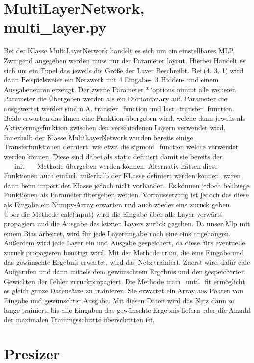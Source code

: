 \documentclass[a4paper]{article}
\title{\trtitle}
\author{\trauthor}
\date{\today}
\begin{document}
	\maketitle
	
	\section{MultiLayerNetwork, multi\_layer.py}
		Bei der Klasse MultiLayerNetwork handelt es sich um ein einstellbares MLP. 
		Zwingend angegeben werden muss nur der Parameter layout. Hierbei Handelt es sich 
		um ein Tupel das jeweils die Größe der Layer Beschreibt. Bei (4, 3, 1) wird
		dann Beispielsweise ein Netzwerk mit 4 Eingabe-, 3 Hidden- und einem Ausgabeneuron 
		erzeugt. Der zweite Parameter **options nimmt alle weiteren Parameter die Übergeben
		werden als ein Dictionionary auf. Parameter die ausgewertet werden sind u.A. transfer\_function
		und last\_transfer\_function. Beide erwarten das ihnen eine Funktion übergeben wird, welche dann
		jeweils als Aktivierungsfunktion zwischen den verschiedenen Layern verwendet wird.
		Innerhalb der Klasse MultiLayerNetwork wurden bereits einige Transferfunktionen definiert,
		wie etwa die sigmoid\_function welche verwendet werden können. Diese sind dabei als static definiert
		damit sie bereits der \_\_init\_\_ Methode übergeben werden können. Alternativ hätten diese Funktionen
		auch einfach außerhalb der KLasse definiert werden können, wären dann beim import der Klasse jedoch nicht vorhanden.
		Es können jedoch belibiege Funktionen als Parameter übergeben werden. Vorraussetzung ist jedoch das diese als Eingabe
		ein Numpy-Array erwarten und auch wieder eins zurück geben. \\

		Über die Methode calc(input) wird die Eingabe über alle Layer vorwärts propagiert und die Ausgabe des letzten Layers 
		zurück gegeben. Da unser Mlp mit einem Bias arbeitet, wird für jede Layereingabe noch eine eins angehangen.
		Außerdem wird jede Layer ein und Ausgabe gespeichert, da diese fürs eventuelle zurück propagieren benötigt wird.
		Mit der Methode train, die eine Eingabe und das gewünschte Ergebnis erwartet, wird das Netz trainiert.
		Zuerst wird dafür calc Aufgerufen und dann mittels dem gewünschtem Ergebnis und den gespeicherten Gewichten der
		Fehler zurückpropagiert. 
		Die Methode train\_until\_fit ermöglicht es gleich ganze Datensätze zu trainieren. Sie erwartet ein Array aus 
		Paaren von Eingabe und gewünschter Ausgabe. Mit diesen Daten wird das Netz dann so lange trainiert, bis alle
		Eingaben das gewünschte Ergebnis liefern oder die Anzahl der maximalen Trainingsschritte überschritten ist. 

	\section{Presizer}
		   

	
\end{document}
